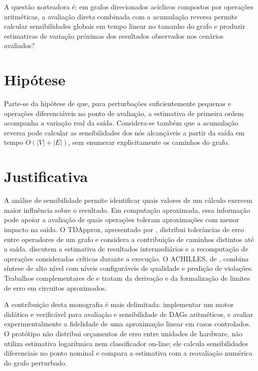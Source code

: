 \documentclass[12pt,openright,oneside,a4paper,brazil]{abntex2}
\begin{document}
A questão norteadora é: em grafos direcionados acíclicos compostos por operações aritméticas, a avaliação direta combinada com a acumulação reversa permite calcular sensibilidades globais em tempo linear no tamanho do grafo e produzir estimativas de variação próximas dos resultados observados nos cenários avaliados?

\section{Hipótese}
Parte-se da hipótese de que, para perturbações suficientemente pequenas e operações diferenciáveis no ponto de avaliação, a estimativa de primeira ordem acompanha a variação real da saída. Considera-se também que a acumulação reversa pode calcular as sensibilidades dos nós alcançáveis a partir da saída em tempo $O(|V|+|E|)$, sem enumerar explicitamente os caminhos do grafo.

\section{Justificativa}
A análise de sensibilidade permite identificar quais valores de um cálculo exercem maior influência sobre o resultado. Em computação aproximada, essa informação pode apoiar a avaliação de quais operações toleram aproximações com menor impacto na saída. O TDApprox, apresentado por , distribui tolerâncias de erro entre operadores de um grafo e considera a contribuição de caminhos distintos até a saída.  discutem a estimativa de resultados intermediários e a recomputação de operações consideradas críticas durante a execução. O ACHILLES, de , combina síntese de alto nível com níveis configuráveis de qualidade e predição de violações. Trabalhos complementares de  e  tratam da derivação e da formalização de limites de erro em circuitos aproximados.

A contribuição desta monografia é mais delimitada: implementar um motor didático e verificável para avaliação e sensibilidade de DAGs aritméticos, e avaliar experimentalmente a fidelidade de uma aproximação linear em casos controlados. O protótipo não distribui orçamentos de erro entre unidades de hardware, não utiliza estimativa logarítmica nem classificador on-line; ele calcula sensibilidades diferenciais no ponto nominal e compara a estimativa com a reavaliação numérica do grafo perturbado.
\end{document}
